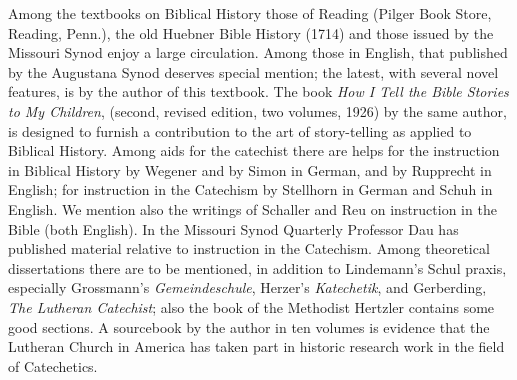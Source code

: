 Among the textbooks on Biblical History those of Reading (Pilger Book Store, Reading, Penn.), the old Huebner Bible History (1714) and those issued by the Missouri Synod enjoy a large circulation. Among those in English, that published by the Augustana Synod deserves special mention; the latest, with several novel features, is by the author of this textbook. The book \emph{How I Tell the Bible Stories to My Children}, (second, revised edition, two volumes, 1926) by the same author, is designed to furnish a contribution to the art of story-telling as applied to Biblical History. Among aids for the catechist there are helps for the instruction in Biblical History by Wegener and by Simon in German, and by Rupprecht in English; for instruction in the Catechism by Stellhorn in German and Schuh in English. We mention also the writings of Schaller and Reu on instruction in the Bible (both English). In the Missouri Synod Quarterly Professor Dau has published material relative to instruction in the Catechism. Among theoretical dissertations there are to be mentioned, in addition to Lindemann’s Schul praxis, especially Grossmann’s \emph{Gemeindeschule}, Herzer’s \emph{Katechetik}, and Gerberding, \emph{The Lutheran Catechist}; also the book of the Methodist Hertzler contains some good sections. A sourcebook by the author in ten volumes is evidence that the Lutheran Church in America has taken part in historic research work in the field of Catechetics.

\trenner

